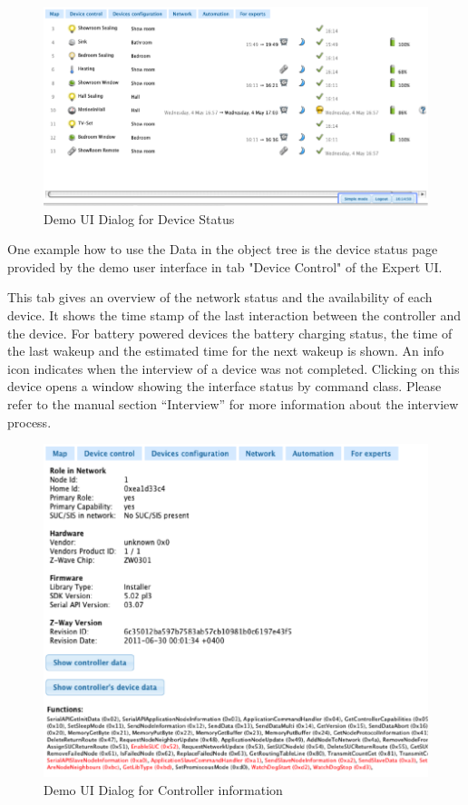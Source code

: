 \begin{figure} 
\begin{center}
\includegraphics[scale=0.8]{pics/devicestatus.png}
\caption{Demo UI Dialog for Device Status}
\label{c4:demostatus} 
\end{center}
 \end{figure}
 
One example how to use the Data in the object tree is the device status page provided by 
the demo user interface in tab "Device Control" of the Expert UI.

 This tab gives an overview of the network status and the availability of each device. It shows the time stamp of the 
 last interaction between the controller  and the device. For battery powered devices the battery charging status, 
 the time of the last wakeup and the estimated time for the next wakeup is shown.
An info icon indicates when the interview of a device was not completed. Clicking on this device opens a window 
showing the interface status by command class. 
Please refer to the manual section “Interview” for more information about the interview process.

\begin{figure} 
\begin{center}
\includegraphics[scale=0.8]{pics/controllerstatus.png}
\caption{Demo UI Dialog for Controller information}
\label{c4:democontroller} 
\end{center}
 \end{figure}
  
